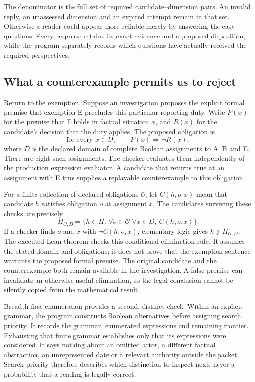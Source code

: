 The denominator is the full set of required candidate--dimension pairs. An
invalid reply, an unassessed dimension and an expired attempt remain in that
set. Otherwise a reader could appear more reliable merely by answering the
easy questions. Every response retains its exact evidence and a proposed
disposition, while the program separately records which questions have actually
received the required perspectives.

\subsection{What a counterexample permits us to reject}

Return to the exemption. Suppose an investigation proposes the explicit formal
premise that exemption E precludes this particular reporting duty. Write
$P(x)$ for the premise that E holds in factual situation $x$, and $R(x)$ for the
candidate's decision that the duty applies. The proposed obligation is
\[
  \text{for every }x\in D,\qquad P(x)\Longrightarrow \neg R(x),
\]
where $D$ is the declared domain of complete Boolean assignments to A, B and E.
There are eight such assignments. The checker evaluates them independently of
the production expression evaluator. A candidate that returns true at an
assignment with E true supplies a replayable counterexample to this obligation.

For a finite collection of declared obligations $\mathcal O$, let
$C(h,o,x)$ mean that candidate $h$ satisfies obligation $o$ at assignment $x$.
The candidates surviving these checks are precisely
\[
  H_{\mathcal O,D}=\{h\in H:\ \forall o\in\mathcal O\;
                              \forall x\in D,\ C(h,o,x)\}.
\]
If a checker finds $o$ and $x$ with $\neg C(h,o,x)$, elementary logic gives
$h\notin H_{\mathcal O,D}$. The executed Lean theorem checks this conditional
elimination rule. It assumes the stated domain and obligations; it does not
prove that the exemption sentence warrants the proposed formal premise.
The original candidate and the counterexample both remain available in the
investigation. A false premise can invalidate an otherwise useful elimination,
so the legal conclusion cannot be silently copied from the mathematical result.

Breadth-first enumeration provides a second, distinct check. Within an explicit
grammar, the program constructs Boolean alternatives before assigning search
priority. It records the grammar, enumerated expressions and remaining
frontier. Exhausting that finite grammar establishes only that its expressions
were considered. It says nothing about an omitted actor, a different factual
abstraction, an unrepresented date or a relevant authority outside the packet.
Search priority therefore describes which distinction to inspect next, never a
probability that a reading is legally correct.


